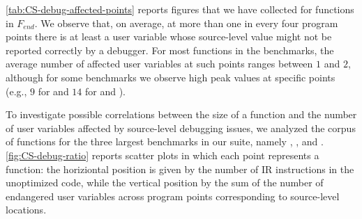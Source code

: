 \mytable\ref{tab:CS-debug-affected-points} reports figures that we have collected for functions in $F_{end}$. We observe that, on average, at more than one in every four program points there is at least a user variable whose source-level value might not be reported correctly by a debugger. For most functions in the benchmarks, the average number of affected user variables at such points ranges between $1$ and $2$, although for some benchmarks we observe high peak values at specific points (e.g., $9$ for  and $14$ for  and ).

To investigate possible correlations between the size of a function and the number of user variables affected by source-level debugging issues, we analyzed the corpus of functions for the three largest benchmarks in our suite, namely , , and . \myfigure\ref{fig:CS-debug-ratio} reports scatter plots in which each point represents a function: the horiziontal position is given by the number of IR instructions in the unoptimized code, while the vertical position by the sum of the number of endangered user variables across program points corresponding to source-level locations.

